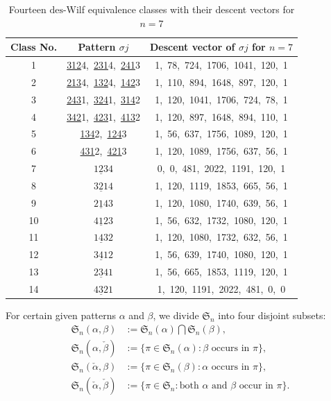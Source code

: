 \documentclass[11pt,reqno]{amsart}
\numberwithin{equation}{section}
\theoremstyle{plain}
\theoremstyle{definition}
\renewcommand{\S}{\mathfrak{S}}
\def\des{\mathrm{des}}
\begin{document}
\begin{table}[h!]
    \setlength{\tabcolsep}{15pt}
    \renewcommand{\arraystretch}{1.2}
    \begin{center}
      \begin{tabular}{c|c|c} 
        Class No. & Pattern $\sigma j$ & Descent vector of $\sigma j$ for $n=7$ \\
        \hline
        1 & \underline{312}4,\ \underline{231}4,\ \underline{241}3  & 1,\ 78,\ 724,\ 1706,\ 1041,\ 120,\ 1 \\
        2 & \underline{213}4,\ \underline{132}4,\ \underline{142}3  & 1,\ 110,\ 894,\ 1648,\ 897,\ 120,\ 1 \\
        3 & \underline{243}1,\ \underline{324}1,\ \underline{314}2  & 1,\ 120,\ 1041,\ 1706,\ 724,\ 78,\ 1 \\
        4 & \underline{342}1,\ \underline{423}1,\ \underline{413}2  & 1,\ 120,\ 897,\ 1648,\ 894,\ 110,\ 1 \\
        5 & \underline{134}2,\ \underline{124}3  & 1,\ 56,\ 637,\ 1756,\ 1089,\ 120,\ 1 \\
        6 & \underline{431}2,\ \underline{421}3  & 1,\ 120,\ 1089,\ 1756,\ 637,\ 56,\ 1 \\ 
        7 & $\underline{123}4$ & 0,\ 0,\ 481,\ 2022,\ 1191,\ 120,\ 1  \\ 
        8 & $\underline{321}4$ & 1,\ 120,\ 1119,\ 1853,\ 665,\ 56,\ 1   \\
        9 & $\underline{214}3$ & 1,\ 120,\ 1080,\ 1740,\ 639,\ 56,\ 1   \\ 
        10 & $\underline{412}3$ & 1,\ 56,\ 632,\ 1732,\ 1080,\ 120,\ 1   \\
        11 & $\underline{143}2$ & 1,\ 120,\ 1080,\ 1732,\ 632,\ 56,\ 1   \\ 
        12 & $\underline{341}2$ & 1,\ 56,\ 639,\ 1740,\ 1080,\ 120,\ 1   \\ 
        13 & $\underline{234}1$ & 1,\ 56,\ 665,\ 1853,\ 1119,\ 120,\ 1   \\
        14 & $\underline{432}1$ & 1,\ 120,\ 1191,\ 2022,\ 481,\ 0,\ 0   
      \end{tabular}
    \end{center}
  \caption{Fourteen $\des$-Wilf equivalence classes with their descent vectors for $n=7$}
  \label{tab: descent vector of length 4}
\end{table}

For certain given patterns $\alpha$ and $\beta$, we divide $\S_n$ into four disjoint subsets:
\begin{align*}
  \S_n(\alpha,\beta)&:=\S_n(\alpha) \bigcap \S_n(\beta), \\
  \S_n(\alpha,\check{\beta})&:=\{\pi \in \S_n(\alpha): \beta\text{ occurs in }\pi\} ,\\
  \S_n(\check{\alpha},\beta)&:=\{\pi \in \S_n(\beta): \alpha\text{ occurs in }\pi\} ,\\
  \S_n(\check{\alpha},\check{\beta})&:=\{\pi \in \S_n:\text{both }\alpha\text{ and }\beta\text{ occur in }\pi\} . 
\end{align*}
\end{document}
